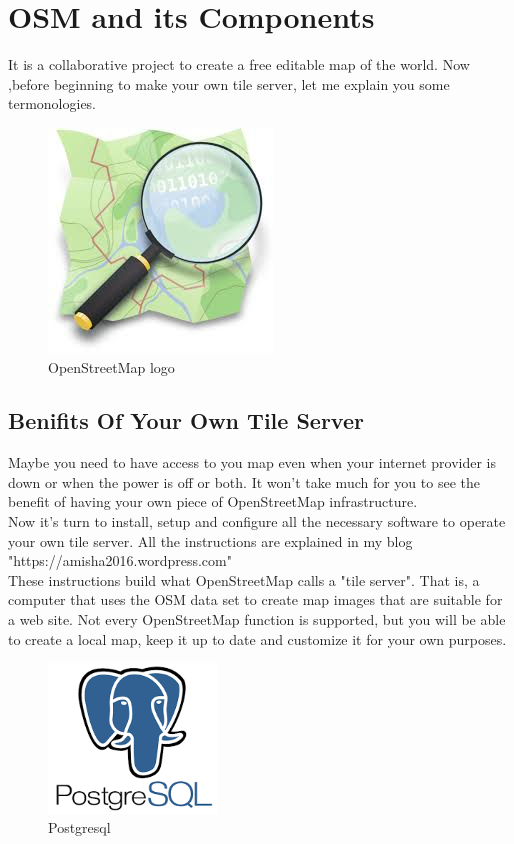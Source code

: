 \section{OSM and its Components }
It is a collaborative project to create a free editable map of the world.
Now ,before beginning to make your own tile server, let me explain you some termonologies.
\begin{figure}[ht]
\centering \includegraphics[scale=0.6]{input/images/index.jpeg}
\caption{OpenStreetMap logo}
\end{figure}

\subsection{Benifits Of Your Own Tile Server}
Maybe you need to have access to you map even when your internet provider is down or when the power is off or both. It won't take much for you to see the benefit of having your own piece of OpenStreetMap infrastructure.\\
Now it's turn to install, setup and configure all the necessary software to operate your own tile server. All the instructions are explained in my blog "https://amisha2016.wordpress.com"\\
These instructions build what OpenStreetMap calls a "tile server". That is, a computer that uses the OSM data set to create map images that are suitable for a web site. Not every OpenStreetMap function is supported, but you will be able to create a local map, keep it up to date and customize it for your own purposes.
\begin{figure}[!ht]
\centering
\includegraphics[width=0.4\textwidth]{input/images/index.png}                   
\caption{Postgresql}
\hspace{-1.5em}
\end{figure}


